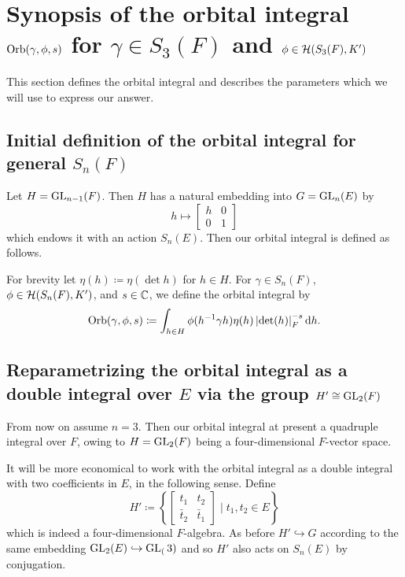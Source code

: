 \section{Synopsis of the orbital integral $\operatorname{Orb}(\gamma, \phi, s)$ for $\gamma \in S_3(F)$ and $\phi \in \mathcal H(S_3(F), K')$}
\label{sec:orbital0}

This section defines the orbital integral
and describes the parameters which we will use to express our answer.

\subsection{Initial definition of the orbital integral for general $S_n(F)$}
Let $H = \operatorname{GL}_{n-1}(F)$.
Then $H$ has a natural embedding into $G = \operatorname{GL}_n(E)$
by \[ h \mapsto \left[ \begin{smallmatrix} h & 0 \\ 0 & 1 \end{smallmatrix} \right] \]
which endows it with an action $S_n(E)$.
Then our orbital integral is defined as follows.
\begin{definition}
  For brevity let $\eta(h) \coloneqq \eta(\det h)$ for $h \in H$.
  For $\gamma \in S_n(F)$, $\phi \in \mathcal H(S_n(F), K')$, and $s \in \mathbb C$,
  we define the orbital integral by
  \[ \Orb(\gamma, \phi, s) \coloneqq
    \int_{h \in H} \phi(h\inv \gamma h) \eta(h)
    \left\lvert \det(h) \right\rvert_F^{-s} \odif h. \]
\end{definition}

\subsection{Reparametrizing the orbital integral as a double integral over $E$
  via the group $H' \cong \operatorname{GL}_2(F)$}
From now on assume $n = 3$.
Then our orbital integral at present a quadruple integral over $F$,
owing to $H = \operatorname{GL}_{2}(F)$ being a four-dimensional $F$-vector space.

It will be more economical to work with the orbital integral as a double integral
with two coefficients in $E$, in the following sense.
Define
\[ H' \coloneqq
  \left\{ \begin{bmatrix} t_1 & t_2 \\ \bar t_2 & \bar t_1 \end{bmatrix}
    \mid t_1, t_2 \in E \right\}
\]
which is indeed a four-dimensional $F$-algebra.
As before $H' \hookrightarrow G$ according to the same embedding
$\operatorname{GL}_2(E) \hookrightarrow \operatorname{GL}_(3)$
and so $H'$ also acts on $S_n(E)$ by conjugation.

